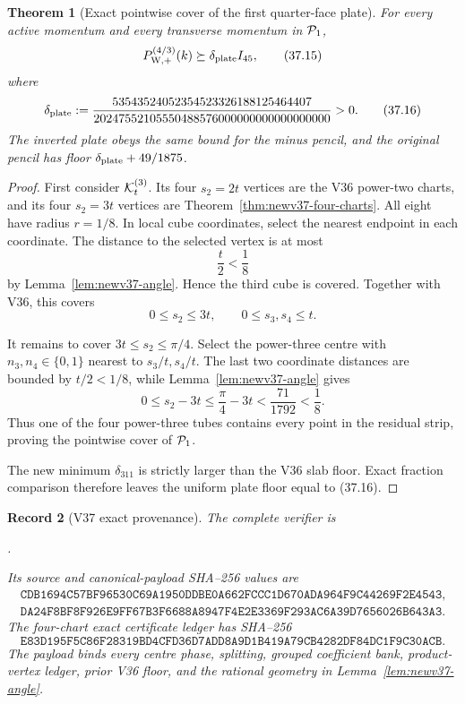\documentclass[11pt,oneside]{article}
\newtheorem{theorem}{Theorem}[section]
\newtheorem{record}[theorem]{Record}
\theoremstyle{definition}
\theoremstyle{remark}
\begin{document}
\begin{theorem}[Exact pointwise cover of the first quarter-face
plate]
\label{thm:newv37-plate-cover}
For every active momentum and every transverse momentum in
\({\cal P}_1\),
\[
 P_{\mathrm W,+}^{(4/3)}(k)
 \succeq\delta_{\rm plate}I_{45},                      \tag{37.15}
\]
where
\[
 \delta_{\rm plate}:=
\frac{53543524052354523326188125464407}
{20247552105550488576000000000000000000}>0.           \tag{37.16}
\]
The inverted plate obeys the same bound for the minus pencil, and
the original pencil has floor
\(\delta_{\rm plate}+49/1875\).
\end{theorem}

\begin{proof}
First consider \({\cal K}^{(3)}_t\).  Its four \(s_2=2t\)
vertices are the V36 power-two charts, and its four \(s_2=3t\)
vertices are Theorem~\ref{thm:newv37-four-charts}.  All eight have
radius \(r=1/8\).  In local cube coordinates, select the nearest
endpoint in each coordinate.  The distance to the selected vertex
is at most
\[
 \frac t2<\frac18                                      \tag{37.17}
\]
by Lemma~\ref{lem:newv37-angle}.  Hence the third cube is covered.
Together with V36, this covers
\[
 0\le s_2\le3t,\qquad0\le s_3,s_4\le t.
\]

It remains to cover \(3t\le s_2\le\pi/4\).  Select the power-three
centre with \(n_3,n_4\in\{0,1\}\) nearest to \(s_3/t,s_4/t\).
The last two coordinate distances are bounded by \(t/2<1/8\),
while Lemma~\ref{lem:newv37-angle} gives
\[
 0\le s_2-3t\le\frac{\pi}{4}-3t
 <\frac{71}{1792}<\frac18.                            \tag{37.18}
\]
Thus one of the four power-three tubes contains every point in the
residual strip, proving the pointwise cover of \({\cal P}_1\).

The new minimum \(\delta_{311}\) is strictly larger than the V36
slab floor.  Exact fraction comparison therefore leaves the uniform
plate floor equal to (37.16).
\end{proof}

\begin{record}[V37 exact provenance]
\label{rec:newv37-provenance}
The complete verifier is
\begin{center}
\footnotesize
{}.
\end{center}
Its source and canonical-payload SHA--256 values are
\[
\begin{gathered}
\texttt{CDB1694C57BF96530C69A1950DDBE0A662FCCC1D670ADA964F9C44269F2E4543},\\
\texttt{DA24F8BF8F926E9FF67B3F6688A8947F4E2E3369F293AC6A39D7656026B643A3}.
\end{gathered}                                         \tag{37.19}
\]
The four-chart exact certificate ledger has SHA--256
\[
\texttt{E83D195F5C86F28319BD4CFD36D7ADD8A9D1B419A79CB4282DF84DC1F9C30ACB}.
                                                               \tag{37.20}
\]
The payload binds every centre phase, splitting, grouped coefficient
bank, product-vertex ledger, prior V36 floor, and the rational
geometry in Lemma~\ref{lem:newv37-angle}.
\end{record}
\end{document}
